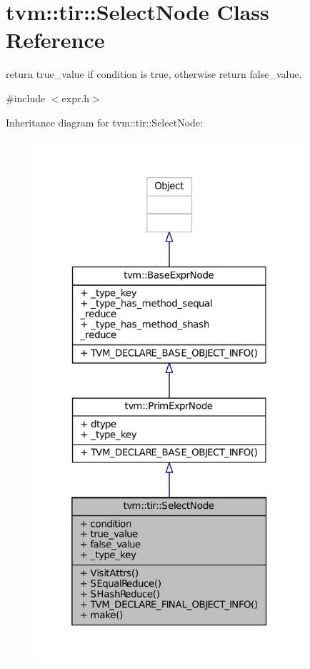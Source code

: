 \hypertarget{classtvm_1_1tir_1_1SelectNode}{}\section{tvm\+:\+:tir\+:\+:Select\+Node Class Reference}
\label{classtvm_1_1tir_1_1SelectNode}


return true\+\_\+value if condition is true, otherwise return false\+\_\+value.  




{\ttfamily \#include $<$expr.\+h$>$}



Inheritance diagram for tvm\+:\+:tir\+:\+:Select\+Node\+:
\nopagebreak
\begin{figure}[H]
\begin{center}
\leavevmode
\includegraphics[height=550pt]{classtvm_1_1tir_1_1SelectNode__inherit__graph}
\end{center}
\end{figure}


